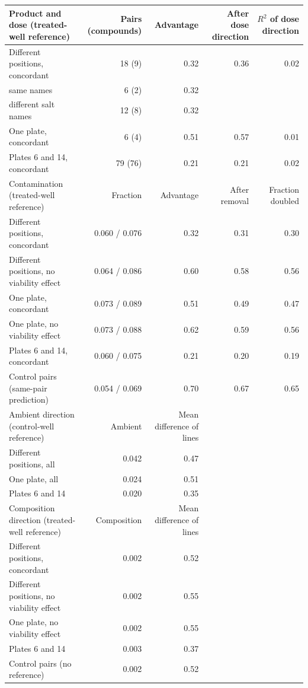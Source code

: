 \begin{table}[!htbp]
{\begin{minipage}{183mm}
\begin{tabular}{@{}>{\raggedright\arraybackslash}p{70mm}rrrr@{}}
\midrule
Product and dose (treated-well reference) & Pairs (compounds) & Advantage & After dose direction & $R^2$ of dose direction \\
\midrule
Different positions, concordant & 18 (9) & 0.32 & 0.36 & 0.02 \\
\quad same names & 6 (2) & 0.32 & & \\
\quad different salt names & 12 (8) & 0.32 & & \\
One plate, concordant & 6 (4) & 0.51 & 0.57 & 0.01 \\
Plates 6 and 14, concordant & 79 (76) & 0.21 & 0.21 & 0.02 \\
\midrule
Contamination (treated-well reference) & Fraction & Advantage & After removal & Fraction doubled \\
\midrule
Different positions, concordant & 0.060 / 0.076 & 0.32 & 0.31 & 0.30 \\
Different positions, no viability effect & 0.064 / 0.086 & 0.60 & 0.58 & 0.56 \\
One plate, concordant & 0.073 / 0.089 & 0.51 & 0.49 & 0.47 \\
One plate, no viability effect & 0.073 / 0.088 & 0.62 & 0.59 & 0.56 \\
Plates 6 and 14, concordant & 0.060 / 0.075 & 0.21 & 0.20 & 0.19 \\
Control pairs (same-pair prediction) & 0.054 / 0.069 & 0.70 & 0.67 & 0.65 \\
\midrule
Ambient direction (control-well reference) & Ambient & Mean difference of lines & & \\
\midrule
Different positions, all & 0.042 & 0.47 & & \\
One plate, all & 0.024 & 0.51 & & \\
Plates 6 and 14 & 0.020 & 0.35 & & \\
\midrule
Composition direction (treated-well reference) & Composition & Mean difference of lines & & \\
\midrule
Different positions, concordant & 0.002 & 0.52 & & \\
Different positions, no viability effect & 0.002 & 0.55 & & \\
One plate, no viability effect & 0.002 & 0.55 & & \\
Plates 6 and 14 & 0.003 & 0.37 & & \\
Control pairs (no reference) & 0.002 & 0.52 & & \\
\bottomrule\end{tabular}
\end{minipage}}
\makebox[\textwidth][c]{\usebox{\tbox}}
\end{table}

